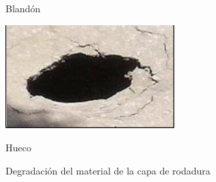 \begin{figure}[ht!]
\begin{minipage}{0.3\linewidth}
		\caption*{\centering Blandón}
	\end{minipage}
	\hspace{3 cm}
	\begin{minipage}{0.3\linewidth}
		\centering
		\includegraphics[width=\linewidth]{figs/hueco.png}
		\caption*{\centering Hueco}
	\end{minipage}
	
	\caption{Degradación del material de la capa de rodadura}
	\label{fig:desprendimiento}
\end{figure}


